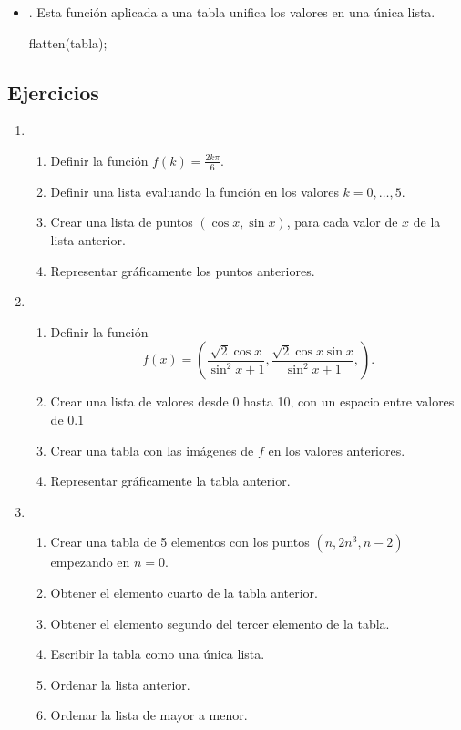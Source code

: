 \begin{itemize}
	\item {}. Esta función aplicada a una tabla unifica
		los valores en una única lista.
		\begin{maximai}
			flatten(tabla);
		\end{maximai}\begin{maximao}
			\left[ 1 , 2 , -3 , 4 , 8 , 7 , -10 , 11 \right]
		\end{maximao}

\end{itemize}

\subsection*{Ejercicios}

\begin{enumerate}

	\item \begin{enumerate}
			\item Definir la función $f(k)=\frac{2k\pi}{6}$.
			\item Definir una lista evaluando la función en los valores
				$k=0,\ldots,5$.
			\item Crear una lista de puntos $(\cos x, \sin x)$, para
				cada valor de $x$ de la lista anterior.
			\item Representar gráficamente los puntos anteriores.
	\end{enumerate}

\item \begin{enumerate}
		\item Definir la función
			\begin{equation*}
				f(x) = \left( \frac{\sqrt{2}\cos x}{\sin^2 x +1},
				\frac{\sqrt{2}\cos x\sin x}{\sin^2 x +1},\right).
			\end{equation*}
		\item Crear una lista de valores desde 0 hasta 10,
			con un espacio entre valores de $0.1$
		\item Crear una tabla con las imágenes de $f$ en los
			valores anteriores.
		\item Representar gráficamente la tabla anterior.
\end{enumerate}

		\item \begin{enumerate}
				\item Crear una tabla de 5 elementos con los puntos
					$(n,2n^3,n-2)$ empezando en $n=0$.
				\item Obtener el elemento cuarto de la tabla anterior.
				\item Obtener el elemento segundo del tercer elemento
					de la tabla.
				\item Escribir la tabla como una única lista.
				\item Ordenar la lista anterior.
				\item Ordenar la lista de mayor a menor.
		\end{enumerate}

\end{enumerate}
